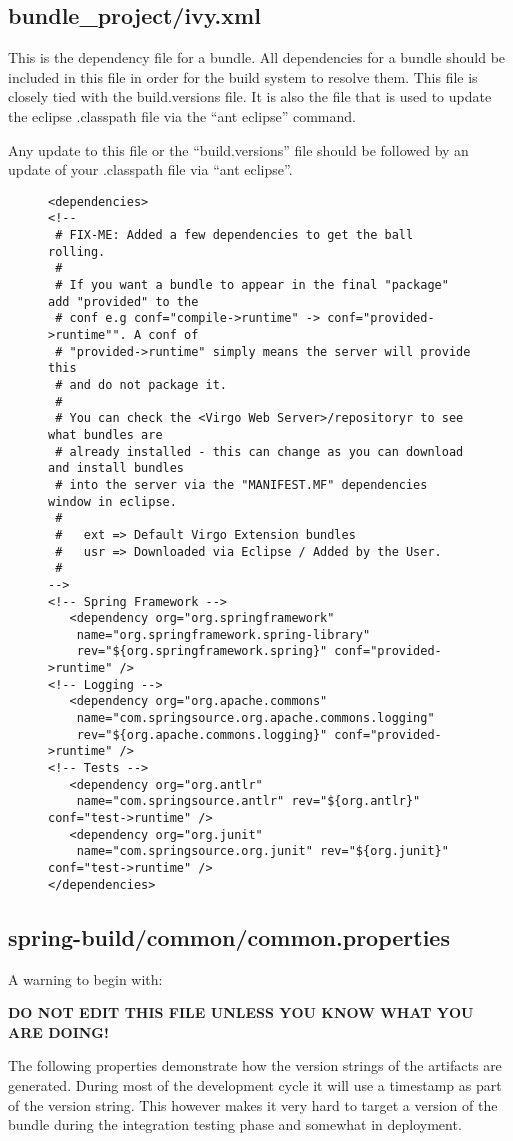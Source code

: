 \subsection{bundle\_project/ivy.xml}
This is the dependency file for a bundle. All dependencies for a bundle should be included 
in this file in order for the build system to resolve them. This file is closely tied with
the build.versions file. It is also the file that is used to update the eclipse .classpath
file via the ``ant eclipse'' command. 

Any update to this file or the ``build.versions'' file should be followed by an update
of your .classpath file via ``ant eclipse''.
\begin{figure}[H]
\begin{verbatim}
<dependencies>
<!--
 # FIX-ME: Added a few dependencies to get the ball rolling.
 #
 # If you want a bundle to appear in the final "package" add "provided" to the
 # conf e.g conf="compile->runtime" -> conf="provided->runtime"". A conf of
 # "provided->runtime" simply means the server will provide this
 # and do not package it.
 #
 # You can check the <Virgo Web Server>/repositoryr to see what bundles are
 # already installed - this can change as you can download and install bundles
 # into the server via the "MANIFEST.MF" dependencies window in eclipse.
 #
 #   ext => Default Virgo Extension bundles
 #   usr => Downloaded via Eclipse / Added by the User.
 #
-->
<!-- Spring Framework -->
   <dependency org="org.springframework"
	name="org.springframework.spring-library"
	rev="${org.springframework.spring}" conf="provided->runtime" />
<!-- Logging -->
   <dependency org="org.apache.commons"
	name="com.springsource.org.apache.commons.logging"
	rev="${org.apache.commons.logging}" conf="provided->runtime" />
<!-- Tests -->
   <dependency org="org.antlr"
	name="com.springsource.antlr" rev="${org.antlr}" conf="test->runtime" />
   <dependency org="org.junit"
	name="com.springsource.org.junit" rev="${org.junit}" conf="test->runtime" />
</dependencies>
\end{verbatim}
\end{figure}

\subsection{spring-build/common/common.properties}
A warning to begin with:

\textbf{DO NOT EDIT THIS FILE UNLESS YOU KNOW WHAT YOU ARE DOING!}

The following properties demonstrate how the version strings of the artifacts are
generated. During most of the development cycle it will use a timestamp as part
of the version string. This however makes it very hard to target a version of the
bundle during the integration testing phase and somewhat in deployment.

